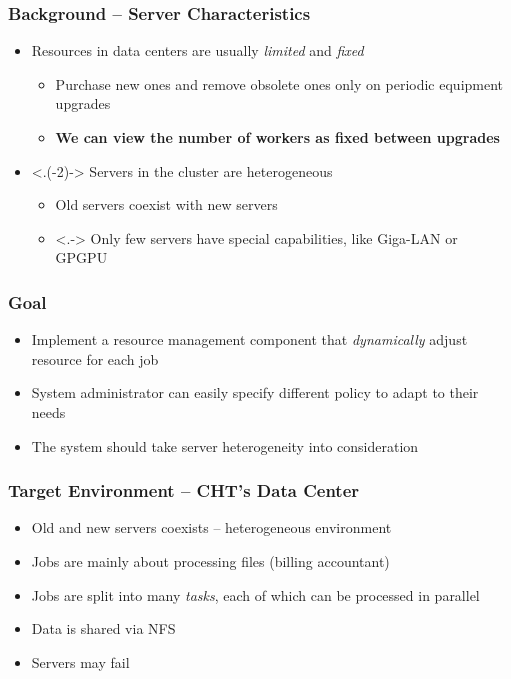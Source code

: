 \begin{frame}
  \frametitle{Background -- Server Characteristics}
  \begin{itemize}[<+->]
    \item Resources in data centers are usually \emph{limited} and
      \emph{fixed}
      \begin{itemize}
        \item Purchase new ones and remove obsolete ones only on
          periodic equipment upgrades
        \item \textbf{We can view the number of workers as fixed between
          upgrades}
      \end{itemize}
    \item <.(-2)-> Servers in the cluster are \alert{heterogeneous}
      \begin{itemize}
        \item Old servers coexist with new servers
        \item <.-> Only few servers have special capabilities, like Giga-LAN
          or GPGPU
      \end{itemize}
  \end{itemize}
\end{frame}

\begin{frame}
  \frametitle{Goal}
  \begin{itemize}
    \item Implement a resource management component that \emph{dynamically}
      adjust resource for each job
    \item System administrator can easily specify different policy to
      adapt to their needs
    \item The system should take server heterogeneity into consideration
  \end{itemize}
\end{frame}

\begin{frame}
  \frametitle{Target Environment -- CHT's Data Center}
  \begin{itemize}
    \item Old and new servers coexists -- heterogeneous environment
    \item Jobs are mainly about processing files (billing accountant)
    \item Jobs are split into many \emph{tasks}, each of which can be processed
      in parallel
    \item Data is shared via NFS
    \item Servers may fail
  \end{itemize}
\end{frame}

